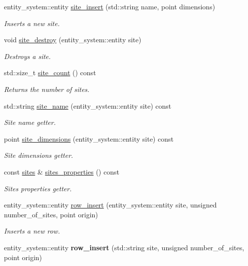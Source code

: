 \begin{DoxyCompactItemize}
\item 
entity\-\_\-system\-::entity \hyperlink{classophidian_1_1floorplan_1_1floorplan_aa04c508c2e1fb9792180ff193bb6c9a4}{site\-\_\-insert} (std\-::string name, point dimensions)
\begin{DoxyCompactList}\small\item\em Inserts a new site. \end{DoxyCompactList}\item 
void \hyperlink{classophidian_1_1floorplan_1_1floorplan_aa3c7e6702fd19eebbc069dbfc7652ba9}{site\-\_\-destroy} (entity\-\_\-system\-::entity site)
\begin{DoxyCompactList}\small\item\em Destroys a site. \end{DoxyCompactList}\item 
std\-::size\-\_\-t \hyperlink{classophidian_1_1floorplan_1_1floorplan_a4c802b4b7d01d32124c08441a252a595}{site\-\_\-count} () const 
\begin{DoxyCompactList}\small\item\em Returns the number of sites. \end{DoxyCompactList}\item 
std\-::string \hyperlink{classophidian_1_1floorplan_1_1floorplan_a9d05603cb565cf6d24a5690a406b2df6}{site\-\_\-name} (entity\-\_\-system\-::entity site) const 
\begin{DoxyCompactList}\small\item\em Site name getter. \end{DoxyCompactList}\item 
point \hyperlink{classophidian_1_1floorplan_1_1floorplan_a5c532d746ce6ad325c5eaf4695dc69e8}{site\-\_\-dimensions} (entity\-\_\-system\-::entity site) const 
\begin{DoxyCompactList}\small\item\em Site dimensions getter. \end{DoxyCompactList}\item 
const \hyperlink{classophidian_1_1floorplan_1_1sites}{sites} \& \hyperlink{classophidian_1_1floorplan_1_1floorplan_a8cdc6ae613d2eb53eff766539bfa2d3d}{sites\-\_\-properties} () const 
\begin{DoxyCompactList}\small\item\em Sites properties getter. \end{DoxyCompactList}\item 
entity\-\_\-system\-::entity \hyperlink{classophidian_1_1floorplan_1_1floorplan_a7b9ea06c0e59d7c7943b044a9c93c0b7}{row\-\_\-insert} (entity\-\_\-system\-::entity site, unsigned number\-\_\-of\-\_\-sites, point origin)
\begin{DoxyCompactList}\small\item\em Inserts a new row. \end{DoxyCompactList}\item 
\hypertarget{classophidian_1_1floorplan_1_1floorplan_aaf3a869cead2043a38ae83d95ddd6744}{entity\-\_\-system\-::entity {\bfseries row\-\_\-insert} (std\-::string site, unsigned number\-\_\-of\-\_\-sites, point origin)}\label{classophidian_1_1floorplan_1_1floorplan_aaf3a869cead2043a38ae83d95ddd6744}


\end{DoxyCompactItemize}
